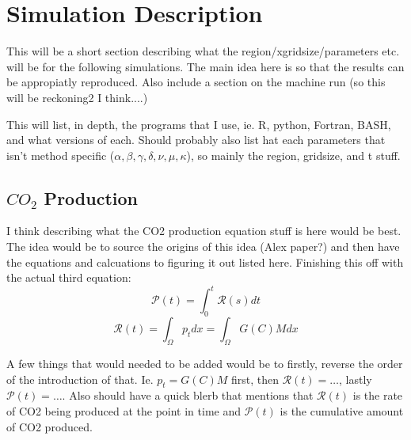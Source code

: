 \section{Simulation Description}

This will be a short section describing what the region/xgridsize/parameters etc. will be for the following simulations.
The main idea here is so that the results can be appropiatly reproduced. 
Also include a section on the machine run (so this will be reckoning2 I think....)

This will list, in depth, the programs that I use, ie. R, python, Fortran, BASH, and what versions of each.
Should probably also list hat each parameters that isn't method specific ($\alpha, \beta ,\gamma, \delta, \nu, \mu, \kappa$), so mainly the region, gridsize, and t stuff.

\subsection{$CO_2$ Production}

I think describing what the CO2 production equation stuff is here would be best. The idea would be to source the origins of this idea (Alex paper?) and then have the equations and calcuations to figuring it out listed here. Finishing this off with the actual third equation:
\begin{equation}
 \mathcal{P}(t) = \int^t_0 \mathcal{R}(s) dt
\end{equation}
\begin{equation}
 \mathcal{R}(t) = \int_\Omega p_t dx = \int_\Omega G(C) M dx
\end{equation}

A few things that would needed to be added would be to firstly, reverse the order of the introduction of that. Ie. $p_t = G(C) M$ first, then $\mathcal{R}(t) = \ldots$, lastly $\mathcal{P}(t) =\ldots$. Also should have a quick blerb that mentions that $\mathcal{R}(t)$ is the rate of CO2 being produced at the point in time and $\mathcal{P}(t)$ is the cumulative amount of CO2 produced.
